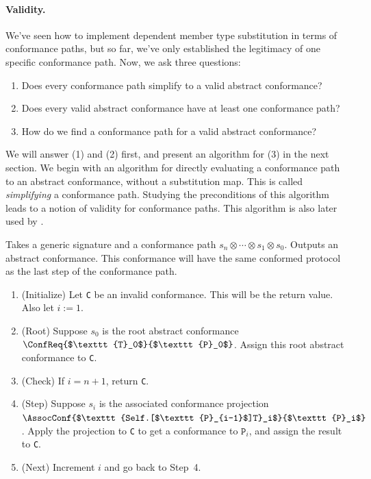 \documentclass[../generics]{subfiles}
\begin{document}
\paragraph{Validity.} We've seen how to implement dependent member type substitution in terms of conformance paths, but so far, we've only established the legitimacy of one specific conformance path. Now, we ask three questions:
\begin{enumerate}
\item Does every conformance path simplify to a valid abstract conformance?
\item Does every valid abstract conformance have at least one conformance path?
\item How do we find a conformance path for a valid abstract conformance?
\end{enumerate}
We will answer (1) and (2) first, and present an algorithm for (3) in the next section. We begin with an algorithm for directly evaluating a conformance path to an abstract conformance, without a substitution map. This is called \emph{simplifying} a conformance path. Studying the preconditions of this algorithm leads to a notion of validity for conformance paths. This algorithm is also later used by .
\begin{algorithm}\label{invertconformancepath}
Takes a generic signature and a conformance path $s_n\otimes\cdots\otimes s_1\otimes s_0$. Outputs an abstract conformance. This conformance will have the same conformed protocol as the last step of the conformance path.
\begin{enumerate}
\item (Initialize) Let \texttt{C} be an invalid conformance. This will be the return value. Also let $i := 1$.
\item (Root) Suppose $s_0$ is the root abstract conformance $\ConfReq{$\texttt{T}_0$}{$\texttt{P}_0$}$. Assign this root abstract conformance to \texttt{C}.
\item (Check) If $i=n+1$, return \texttt{C}.
\item (Step) Suppose $s_i$ is the associated conformance projection $\AssocConf{$\texttt{Self.[$\texttt{P}_{i-1}$]T}_i$}{$\texttt{P}_i$}$. Apply the projection to \texttt{C} to get a conformance to $\texttt{P}_i$, and assign the result to \texttt{C}.
\item (Next) Increment $i$ and go back to Step~4.
\end{enumerate}
\end{algorithm}
\end{document}
